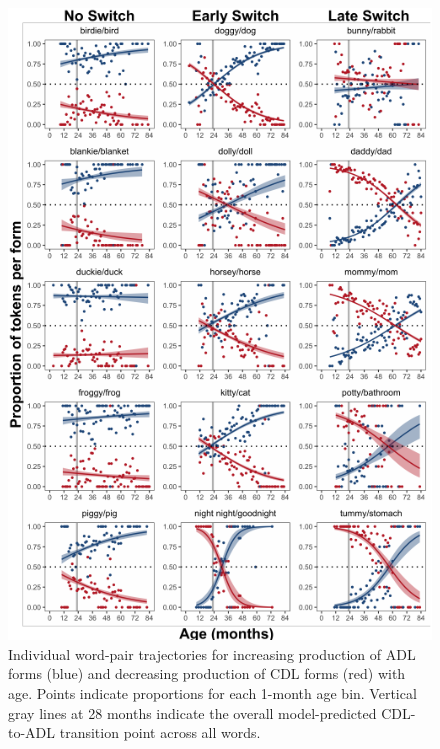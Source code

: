 \documentclass[10pt, letterpaper]{article}
\newenvironment{CodeChunk}{}{}
\begin{document}
\begin{CodeChunk}
\begin{figure}[!ht]

{\centering \includegraphics{figs/shift-timing-bypair-fig-1} 

}

\caption[Individual word-pair trajectories for increasing production of ADL forms (blue) and decreasing production of CDL forms (red) with age]{Individual word-pair trajectories for increasing production of ADL forms (blue) and decreasing production of CDL forms (red) with age. Points indicate proportions for each 1-month age bin. Vertical gray lines at 28 months indicate the overall model-predicted CDL-to-ADL transition point across all words.}\label{fig:shift-timing-bypair-fig}
\end{figure}
\end{CodeChunk}
\end{document}
